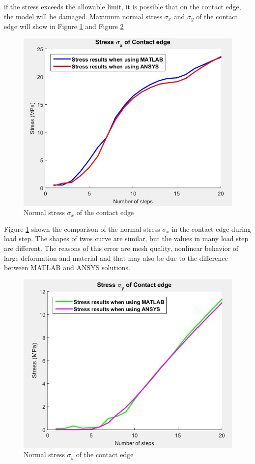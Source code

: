 if the stress exceeds the allowable limit,
it is possible that on the contact edge, the model will be damaged.
\vspace{0.38cm} \newline
Maximum normal stress $\sigma_x$ and $\sigma_y$ of the contact edge will show in
Figure \ref{fig:sx_c_r} and Figure \ref{fig:sy_c_r}
\newline
\begin{figure}[H]
    \centering
    \includegraphics[scale=0.7]{Figures/sx_c_r.jpg}
    \decoRule
    \caption{Normal stress $\sigma_x$ of the contact edge}
    \label{fig:sx_c_r}
\end{figure} \noindent
Figure \ref{fig:sx_c_r} shown the comparison of the normal stress $\sigma_x$ in the contact edge during load step.
The shapes of twos curve are similar, but the values in many load step are different.
The reasons of this error are mesh quality, nonlinear behavior of large deformation and material and that may also be due to the difference between MATLAB and ANSYS solutions.
\vspace{0.38cm}
\begin{figure}[H]
    \centering
    \includegraphics[scale=0.7]{Figures/sy_c_r.jpg}
    \decoRule
    \caption{Normal stress $\sigma_y$ of the contact edge}
    \label{fig:sy_c_r}
\end{figure} \noindent

